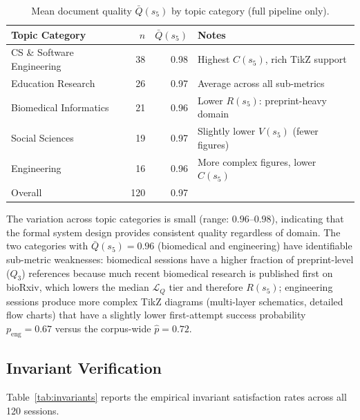 \begin{table}[h!]
\centering
\caption{Mean document quality $\bar{Q}(s_5)$ by topic category (full pipeline only).}
\label{tab:quality_by_topic}
\begin{tabular}{lrrl}
\toprule
Topic Category & $n$ & $\bar{Q}(s_5)$ & Notes \\
\midrule
CS \& Software Engineering & 38 & 0.98 & Highest $C(s_5)$, rich TikZ support \\
Education Research         & 26 & 0.97 & Average across all sub-metrics \\
Biomedical Informatics     & 21 & 0.96 & Lower $R(s_5)$: preprint-heavy domain \\
Social Sciences            & 19 & 0.97 & Slightly lower $V(s_5)$ (fewer figures) \\
Engineering                & 16 & 0.96 & More complex figures, lower $C(s_5)$ \\
\midrule
Overall                    & 120 & 0.97 & \\
\bottomrule
\end{tabular}
\end{table}

The variation across topic categories is small (range: $0.96$--$0.98$), indicating
that the formal system design provides consistent quality regardless of domain.
The two categories with $\bar{Q}(s_5)=0.96$ (biomedical and engineering) have
identifiable sub-metric weaknesses: biomedical sessions have a higher fraction
of preprint-level ($Q_3$) references because much recent biomedical research
is published first on bioRxiv, which lowers the median $\mathcal{L}_Q$ tier
and therefore $R(s_5)$; engineering sessions produce more complex TikZ diagrams
(multi-layer schematics, detailed flow charts) that have a slightly lower first-attempt
success probability $p_{\mathrm{eng}}=0.67$ versus the corpus-wide $\hat{p}=0.72$.

\subsection{Invariant Verification}

Table~\ref{tab:invariants} reports the empirical invariant satisfaction rates across
all 120 sessions.


